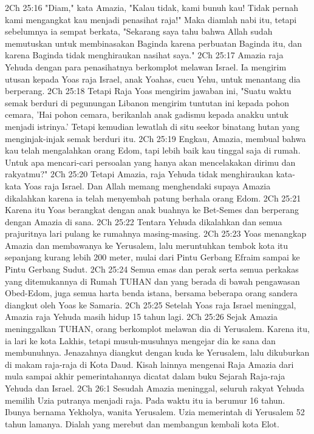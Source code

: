 2Ch 25:16  "Diam," kata Amazia, "Kalau tidak, kami bunuh kau! Tidak pernah kami mengangkat kau menjadi penasihat raja!" Maka diamlah nabi itu, tetapi sebelumnya ia sempat berkata, "Sekarang saya tahu bahwa Allah sudah memutuskan untuk membinasakan Baginda karena perbuatan Baginda itu, dan karena Baginda tidak menghiraukan nasihat saya."
2Ch 25:17  Amazia raja Yehuda dengan para penasihatnya berkomplot melawan Israel. Ia mengirim utusan kepada Yoas raja Israel, anak Yoahas, cucu Yehu, untuk menantang dia berperang.
2Ch 25:18  Tetapi Raja Yoas mengirim jawaban ini, "Suatu waktu semak berduri di pegunungan Libanon mengirim tuntutan ini kepada pohon cemara, 'Hai pohon cemara, berikanlah anak gadismu kepada anakku untuk menjadi istrinya.' Tetapi kemudian lewatlah di situ seekor binatang hutan yang menginjak-injak semak berduri itu.
2Ch 25:19  Engkau, Amazia, membual bahwa kau telah mengalahkan orang Edom, tapi lebih baik kau tinggal saja di rumah. Untuk apa mencari-cari persoalan yang hanya akan mencelakakan dirimu dan rakyatmu?"
2Ch 25:20  Tetapi Amazia, raja Yehuda tidak menghiraukan kata-kata Yoas raja Israel. Dan Allah memang menghendaki supaya Amazia dikalahkan karena ia telah menyembah patung berhala orang Edom.
2Ch 25:21  Karena itu Yoas berangkat dengan anak buahnya ke Bet-Semes dan berperang dengan Amazia di sana.
2Ch 25:22  Tentara Yehuda dikalahkan dan semua prajuritnya lari pulang ke rumahnya masing-masing.
2Ch 25:23  Yoas menangkap Amazia dan membawanya ke Yerusalem, lalu meruntuhkan tembok kota itu sepanjang kurang lebih 200 meter, mulai dari Pintu Gerbang Efraim sampai ke Pintu Gerbang Sudut.
2Ch 25:24  Semua emas dan perak serta semua perkakas yang ditemukannya di Rumah TUHAN dan yang berada di bawah pengawasan Obed-Edom, juga semua harta benda istana, bersama beberapa orang sandera diangkut oleh Yoas ke Samaria.
2Ch 25:25  Setelah Yoas raja Israel meninggal, Amazia raja Yehuda masih hidup 15 tahun lagi.
2Ch 25:26  Sejak Amazia meninggalkan TUHAN, orang berkomplot melawan dia di Yerusalem. Karena itu, ia lari ke kota Lakhis, tetapi musuh-musuhnya mengejar dia ke sana dan membunuhnya. Jenazahnya diangkut dengan kuda ke Yerusalem, lalu dikuburkan di makam raja-raja di Kota Daud. Kisah lainnya mengenai Raja Amazia dari mula sampai akhir pemerintahannya dicatat dalam buku Sejarah Raja-raja Yehuda dan Israel.
2Ch 26:1  Sesudah Amazia meninggal, seluruh rakyat Yehuda memilih Uzia putranya menjadi raja. Pada waktu itu ia berumur 16 tahun. Ibunya bernama Yekholya, wanita Yerusalem. Uzia memerintah di Yerusalem 52 tahun lamanya. Dialah yang merebut dan membangun kembali kota Elot.

